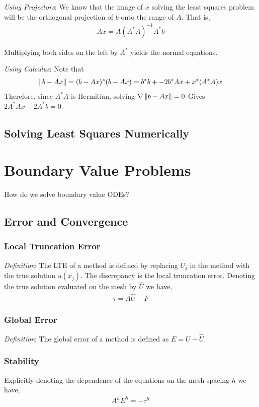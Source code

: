\documentclass[12pt]{article}
\begin{document}
\textit{Using Projectors}:
We know that the image of \( x \) solving the least squares problem will be the orthogonal projection of \( b \) onto the range of \( A \). That is,
\begin{align*}
    Ax = A(A^*A)^{-1}A^*b
\end{align*}

Multiplying both sides on the left by \( A^* \) yields the normal equations.

\textit{Using Calculus}:
Note that
\begin{align*}
    \left\lVert b-Ax\right\rVert = (b-Ax)^*(b-Ax) = b^*b + -2b^*Ax + x^*(A^*A)x
\end{align*}
Therefore, since \( A^*A \) is Hermitian, solving \( \nabla \left\lVert b-Ax\right\rVert = 0 \) Gives \( 2A^*Ax - 2A^*b = 0 \).


\subsection{Solving Least Squares Numerically}

\pagebreak
\section{Boundary Value Problems}
How do we solve boundary value ODEs?

\subsection{Error and Convergence}

\subsubsection{Local Truncation Error}
\textit{Definition}: The LTE of a method is defined by replacing \( U_j \) in the method with the true solution \( u(x_j) \). The discrepancy is the local truncation error. Denoting the true solution evaluated on the mesh by \( \hat{U} \) we have,
\begin{align*}
    \tau = A \hat{U} - F
\end{align*}


\subsubsection{Global Error}
\textit{Definition}: The global error of a method is defined as \( E = U - \hat{U} \).

\subsubsection{Stability}
Explicitly denoting the dependence of the equations on the mesh spacing \( h \) we have,
\begin{align*}
    A^hE^h = -\tau^h
\end{align*}
\end{document}
